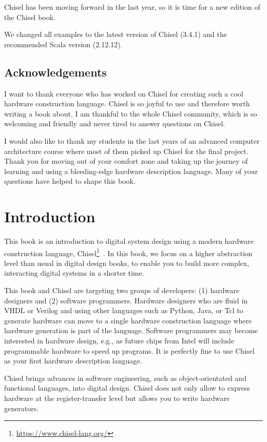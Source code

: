 \documentclass[%
    10pt,
    headinclude, footexclude,
    openright, %
    notitlepage,
    cleardoubleempty,
    headsepline,
    pointlessnumbers,
    bibtotoc, idxtotoc,
    ]{scrbook}
\newcommand{\myref}[2]{\href{#1}{#2}}
\renewcommand{\myref}[2]{{#2}{\footnote{\url{#1}}}}
\begin{document}
Chisel has been moving forward in the last year, so it is time for a new edition
of the Chisel book.

We changed all examples to the latest version of Chisel (3.4.1) and the recommended
Scala version (2.12.12).


\section*{Acknowledgements}

I want to thank everyone who has worked on Chisel for creating such
a cool hardware construction language. Chisel is so joyful to use and
therefore worth writing a book about.
I am thankful to the whole Chisel community, which is so welcoming and friendly
and never tired to answer questions on Chisel.

I would also like to thank my students in the last years of an advanced computer
architecture course where most of them picked up Chisel for the final project.
Thank you for moving out of your comfort zone and taking up the journey of
learning and using a bleeding-edge hardware description language.
Many of your questions have helped to shape this book.


\mainmatter

\chapter{Introduction}
\label{sec:intro}

This book is an introduction to digital system design using a modern hardware
construction language, \myref{https://www.chisel-lang.org/}{Chisel}~\cite{chisel:dac2012}.
In this book, we focus on a higher abstraction level than usual in digital design books,
to enable you to build more complex, interacting digital systems in a shorter time.

This book and Chisel are targeting two groups of developers:
(1) hardware designers and (2) software programmers.
Hardware designers who are fluid in VHDL or Verilog and using other languages such as Python,
Java, or Tcl to generate hardware can move to a single hardware construction language
where hardware generation is part of the language.
Software programmers may become interested in hardware design,
e.g., as future chips from Intel will include programmable hardware to speed up programs.
It is perfectly fine to use Chisel as your first hardware description language.

Chisel brings advances in software engineering, such as object-orientated
and functional languages, into digital design.
Chisel does not only allow to express hardware at the register-transfer level
but allows you to write hardware generators.
\end{document}
